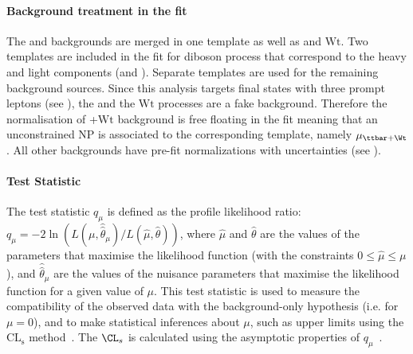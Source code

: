 \paragraph{Background treatment in the fit} The \ttZ and \tWZ backgrounds are merged in one template as well as
\ttbar and $\mathrm{Wt}$. Two templates are included in the fit for diboson process that correspond to the heavy and light components (\VVHF and \VVLF).
Separate templates are used for the remaining background sources.
Since this analysis targets final states with three prompt leptons (see ), the \ttbar and the $\mathrm{Wt}$ processes are a fake background. Therefore the normalisation of \ttbar+$\mathrm{Wt}$ background is free floating in the fit meaning that an unconstrained NP is associated to the corresponding template, namely $\mu_{\ttbar+\Wt}$.
All other backgrounds have pre-fit normalizations with uncertainties (see ).

\paragraph{Test Statistic} The test statistic $q_{\mu}$ is defined as the profile likelihood ratio:\\
$q_{\mu}=-2\ln(L(\mu,\hat{\hat{\theta}}_{\mu})/L(\hat{\mu},\hat{\theta}))$, 
where $\hat{\mu}$ and $\hat{\theta}$ are the values of the parameters that maximise the likelihood function 
(with the constraints $0\leq \hat{\mu}\leq \mu$), and $\hat{\hat{\theta}}_{\mu}$ are the values of the nuisance parameters that maximise the likelihood function for a given value of $\mu$.
This test statistic is used to measure the compatibility of the observed data with the background-only hypothesis (i.e. for $\mu=0$), 
and to make statistical inferences about $\mu$, such as upper limits using the $\mathrm{CL_{s}}$ method~\cite{Junk:1999kv,Read:2002hq}. 
The $\CL_s$ is calculated using the asymptotic properties of $q_{\mu}$~\cite{Verkerke:2003ir, Moneta:2010pm}.


\clearpage
\FloatBarrier

